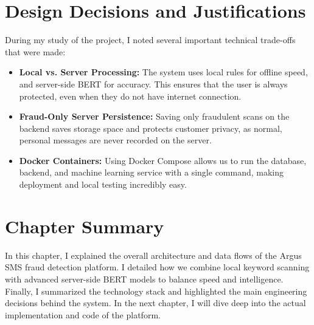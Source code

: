 \section{Design Decisions and Justifications}
During my study of the project, I noted several important technical trade-offs that were made:
\begin{itemize}
  \item \textbf{Local vs. Server Processing:} The system uses local rules for offline speed, and server-side BERT for accuracy. This ensures that the user is always protected, even when they do not have internet connection.
  \item \textbf{Fraud-Only Server Persistence:} Saving only fraudulent scans on the backend saves storage space and protects customer privacy, as normal, personal messages are never recorded on the server.
  \item \textbf{Docker Containers:} Using Docker Compose allows us to run the database, backend, and machine learning service with a single command, making deployment and local testing incredibly easy.
\end{itemize}

\section{Chapter Summary}
In this chapter, I explained the overall architecture and data flows of the Argus SMS fraud detection platform. I detailed how we combine local keyword scanning with advanced server-side BERT models to balance speed and intelligence. Finally, I summarized the technology stack and highlighted the main engineering decisions behind the system. In the next chapter, I will dive deep into the actual implementation and code of the platform.
